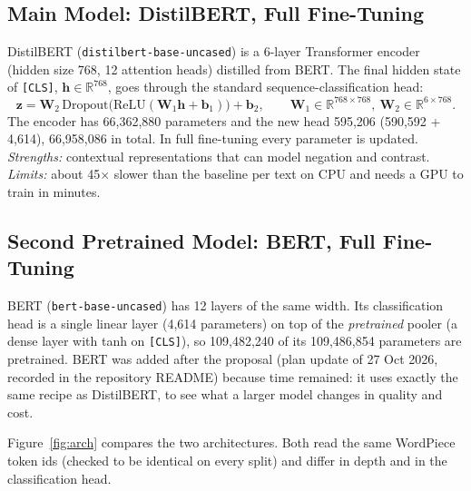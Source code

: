\documentclass[11pt,a4paper]{article}
\begin{document}
\subsection{Main Model: DistilBERT, Full Fine-Tuning}
DistilBERT (\texttt{distilbert-base-uncased}) \cite{sanh2019} is a 6-layer Transformer encoder (hidden size 768, 12 attention heads) distilled from BERT. The final hidden state of \texttt{[CLS]}, $\mathbf{h}\in\mathbb{R}^{768}$, goes through the standard sequence-classification head:
\begin{equation}
\mathbf{z}=\mathbf{W}_2\,\mathrm{Dropout}\big(\mathrm{ReLU}(\mathbf{W}_1\mathbf{h}+\mathbf{b}_1)\big)+\mathbf{b}_2,\qquad \mathbf{W}_1\in\mathbb{R}^{768\times768},\ \mathbf{W}_2\in\mathbb{R}^{6\times768}.
\end{equation}
The encoder has 66,362,880 parameters and the new head 595,206 (590,592 + 4,614), 66,958,086 in total. In full fine-tuning every parameter is updated. \emph{Strengths:} contextual representations that can model negation and contrast. \emph{Limits:} about 45$\times$ slower than the baseline per text on CPU and needs a GPU to train in minutes.

\subsection{Second Pretrained Model: BERT, Full Fine-Tuning}
BERT (\texttt{bert-base-uncased}) \cite{devlin2019} has 12 layers of the same width. Its classification head is a single linear layer (4,614 parameters) on top of the \emph{pretrained} pooler (a dense layer with tanh on \texttt{[CLS]}), so 109,482,240 of its 109,486,854 parameters are pretrained. BERT was added after the proposal (plan update of 27 Oct 2026, recorded in the repository README) because time remained: it uses exactly the same recipe as DistilBERT, to see what a larger model changes in quality and cost.

Figure~\ref{fig:arch} compares the two architectures. Both read the same WordPiece token ids (checked to be identical on every split) and differ in depth and in the classification head.
\end{document}
